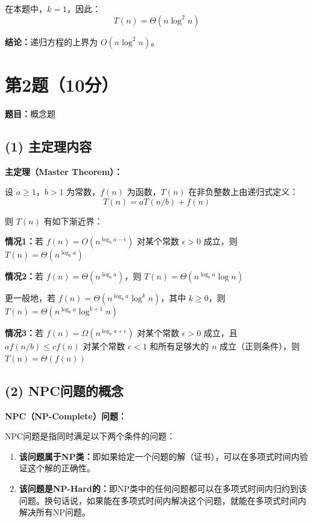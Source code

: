 \documentclass[UTF8,12pt,a4paper]{ctexart}
\begin{document}
在本题中，$k = 1$，因此：
$$T(n) = \Theta(n \log^2 n)$$

\textbf{结论：}递归方程的上界为 $O(n \log^2 n)$。


\section*{第2题（10分）}
\textbf{题目：}概念题

\subsection*{(1) 主定理内容}

\textbf{主定理（Master Theorem）：}

设 $a \geq 1$，$b > 1$ 为常数，$f(n)$ 为函数，$T(n)$ 在非负整数上由递归式定义：
$$T(n) = a T(n/b) + f(n)$$

则 $T(n)$ 有如下渐近界：

\textbf{情况1：}若 $f(n) = O(n^{\log_b a - \epsilon})$ 对某个常数 $\epsilon > 0$ 成立，则 $T(n) = \Theta(n^{\log_b a})$

\textbf{情况2：}若 $f(n) = \Theta(n^{\log_b a})$，则 $T(n) = \Theta(n^{\log_b a} \log n)$

更一般地，若 $f(n) = \Theta(n^{\log_b a} \log^k n)$，其中 $k \geq 0$，则 $T(n) = \Theta(n^{\log_b a} \log^{k+1} n)$

\textbf{情况3：}若 $f(n) = \Omega(n^{\log_b a + \epsilon})$ 对某个常数 $\epsilon > 0$ 成立，且 $a f(n/b) \leq c f(n)$ 对某个常数 $c < 1$ 和所有足够大的 $n$ 成立（正则条件），则 $T(n) = \Theta(f(n))$

\subsection*{(2) NPC问题的概念}

\textbf{NPC（NP-Complete）问题：}

NPC问题是指同时满足以下两个条件的问题：
\begin{enumerate}
	\item \textbf{该问题属于NP类：}即如果给定一个问题的解（证书），可以在多项式时间内验证这个解的正确性。
	
	\item \textbf{该问题是NP-Hard的：}即NP类中的任何问题都可以在多项式时间内归约到该问题。换句话说，如果能在多项式时间内解决这个问题，就能在多项式时间内解决所有NP问题。
\end{enumerate}
\end{document}
